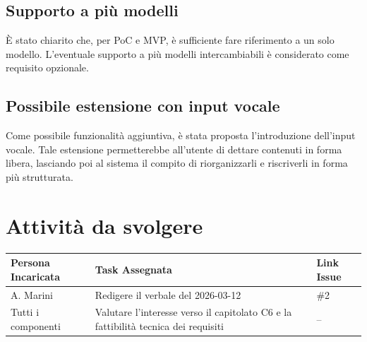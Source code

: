 \documentclass[a4paper, 10pt, colorlinks=true, linkcolor=black, urlcolor=blue, citecolor=blue, hidelinks]{article}
\begin{document}
\subsection{Supporto a più modelli}
È stato chiarito che, per PoC e MVP, è sufficiente fare riferimento a un solo modello. L'eventuale supporto a più modelli intercambiabili è considerato come requisito opzionale.

\subsection{Possibile estensione con input vocale}
Come possibile funzionalità aggiuntiva, è stata proposta l'introduzione dell'input vocale. Tale estensione permetterebbe all'utente di dettare contenuti in forma libera, lasciando poi al sistema il compito di riorganizzarli e riscriverli in forma più strutturata.

\section{Attività da svolgere}
\begin{center}
\renewcommand{\arraystretch}{1.4}
\begin{tabular}{|p{4.2cm}|p{6.2cm}|p{2.2cm}|}
\hline
\textbf{Persona Incaricata} & \textbf{Task Assegnata} & \centering\textbf{Link Issue} \tabularnewline
\hline
A. Marini & Redigere il verbale del 2026-03-12 & \centering \#2 \tabularnewline
\hline
Tutti i componenti & Valutare l'interesse verso il capitolato C6 e la fattibilità tecnica dei requisiti & \centering -- \tabularnewline
\hline
\end{tabular}
\end{center}
\end{document}
